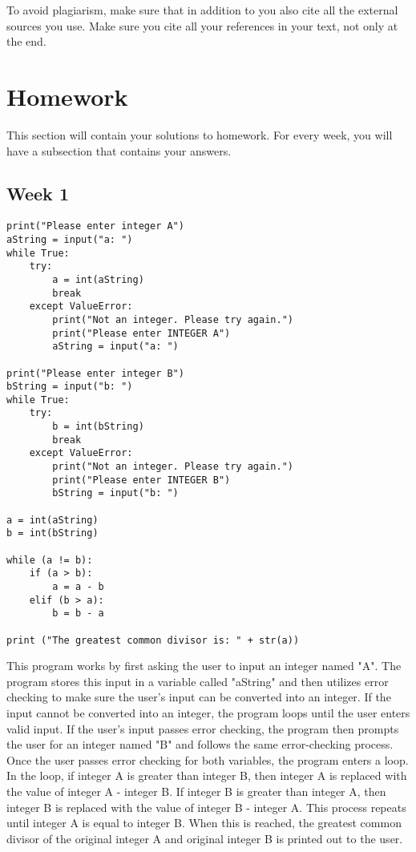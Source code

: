 \documentclass{article}
\theoremstyle{theorem}
\theoremstyle{definition}
\theoremstyle{remark}
\begin{document}
To avoid plagiarism, make sure that in addition to \cite{PL} you also cite all the external sources you use. Make sure you cite all your references in your text, not only at the end.

\section{Homework}\label{homework}

This section will contain your solutions to homework.
For every week, you will have a subsection that contains your answers.

\subsection{Week 1}

\begin{verbatim}
print("Please enter integer A")
aString = input("a: ")
while True:
    try: 
        a = int(aString)
        break
    except ValueError:
        print("Not an integer. Please try again.")
        print("Please enter INTEGER A")
        aString = input("a: ")
    
print("Please enter integer B")
bString = input("b: ")
while True:
    try: 
        b = int(bString)
        break
    except ValueError:
        print("Not an integer. Please try again.")
        print("Please enter INTEGER B")
        bString = input("b: ")

a = int(aString)
b = int(bString)

while (a != b):
    if (a > b):
        a = a - b
    elif (b > a):
        b = b - a
        
print ("The greatest common divisor is: " + str(a))
\end{verbatim}

\indent
This program works by first asking the user to input an integer named "A". 
The program stores this input in a variable called "aString" and then utilizes error checking to make sure the user's input can be converted into an integer.
If the input cannot be converted into an integer, the program loops until the user enters valid input.
If the user's input passes error checking, the program then prompts the user for an integer named "B" and follows the same error-checking process.
Once the user passes error checking for both variables, the program enters a loop.
In the loop, if integer A is greater than integer B, then integer A is replaced with the value of integer A - integer B.
If integer B is greater than integer A, then integer B is replaced with the value of integer B - integer A.
This process repeats until integer A is equal to integer B. When this is reached, the greatest common divisor of the original integer A and original integer B is printed out to the user.
\end{document}
